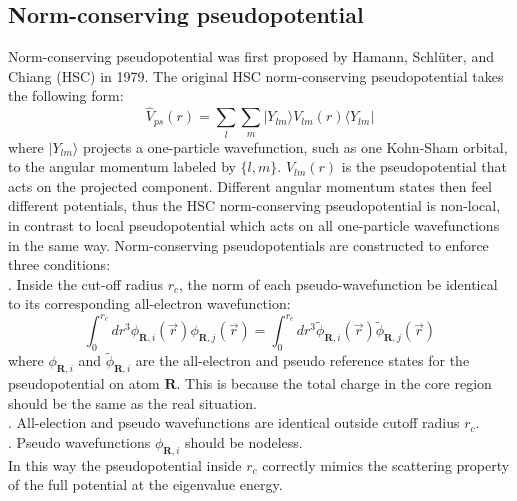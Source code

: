 \documentclass[UTF8]{ctexart}
\begin{document}
        \subsection{Norm-conserving pseudopotential}
            \indent Norm-conserving pseudopotential was first proposed by Hamann, Schlüter, and Chiang (HSC) in 1979. The original HSC
            norm-conserving pseudopotential takes the following form:
            \begin{equation}
                \hat{V}_{ps}(r)=\sum_l\sum_m|Y_{lm}\rangle V_{lm}(r)\langle Y_{lm}|
            \end{equation}
            where $|Y_{lm}\rangle$ projects a one-particle wavefunction, such as one Kohn-Sham orbital, to the angular momentum labeled by
            $\{l,m\}$. $V_{lm}(r)$ is the pseudopotential that acts on the projected component. Different angular momentum states then feel
            different potentials, thus the HSC norm-conserving pseudopotential is non-local, in contrast to local pseudopotential which acts
            on all one-particle wavefunctions in the same way. Norm-conserving pseudopotentials are constructed to enforce three conditions:\\
            . Inside the cut-off radius $r_c$, the norm of each pseudo-wavefunction be identical to its corresponding all-electron wavefunction:
            \begin{equation}
                \int_0^{r_c}dr^3\phi_{\mathbf{R},i}({\vec{r}})\phi_{\mathbf{R},j}({\vec{r}})=
                \int_0^{r_c}dr^{3}{\tilde{\phi}}_{\mathbf{R},i}({\vec{r}}){\tilde{\phi}}_{\mathbf{R},j}({\vec{r}})
            \end{equation}
            where $\phi_{\mathbf{R},i}$ and $\tilde{\phi}_{\mathbf{R},i}$ are the all-electron and pseudo reference states for the pseudopotential
            on atom $\mathbf{R}$. This is because the total charge in the core region should be the same as the real situation.\\
            . All-election and pseudo wavefunctions are identical outside cutoff radius $r_c$.\\
            . Pseudo wavefunctions $\phi_{\mathbf{R},i}$ should be nodeless.\\
            \indent In this way the pseudopotential inside $r_c$ correctly mimics the scattering property of the full potential at the eigenvalue energy.
\end{document}
